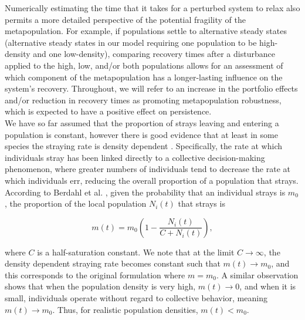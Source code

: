 \documentclass[twocolumn,preprintnumbers,amsmath,amssymb,superscriptaddress]{revtex4}
\begin{document}
Numerically estimating the time that it takes for a perturbed system to relax also permits a more detailed perspective of the potential fragility of the metapopulation.
For example, if populations settle to alternative steady states (alternative steady states in our model requiring one population to be high-density and one low-density), comparing recovery times after a disturbance applied to the high, low, and/or both populations allows for an assessment of which component of the metapopulation has a longer-lasting influence on the system's recovery.
Throughout, we will refer to an increase in the portfolio effects and/or reduction in recovery times as promoting metapopulation robustness, which is expected to have a positive effect on persistence.
\\

\noindent We have so far assumed that the proportion of strays leaving and entering a population is constant, however there is good evidence that at least in some species the straying rate is density dependent \cite{Berdahl:2016dx,Bett:2017ha}.
Specifically, the rate at which individuals stray has been linked directly to a collective decision-making phenomenon, where greater numbers of individuals tend to decrease the rate at which individuals err, reducing the overall proportion of a population that strays.
According to Berdahl et al. \cite{Berdahl:2016dx}, given the probability that an individual strays is $m_0$, the proportion of the local population $N_i(t)$ that strays is

\begin{equation}
  m(t) = m_0\left(1- \frac{N_i(t)}{C+N_i(t)}\right),
  \label{eq:ddm}
\end{equation}

\noindent where $C$ is a half-saturation constant.
We note that at the limit $C\rightarrow \infty$, the density dependent straying rate becomes constant such that $m(t) \rightarrow m_0$, and this corresponds to the original formulation where $m=m_0$.
A similar observation shows that when the population density is very high, $m(t) \rightarrow 0$, and when it is small, individuals operate without regard to collective behavior, meaning $m(t) \rightarrow m_0$.
Thus, for realistic population densities, $m(t) < m_0$.
\end{document}
